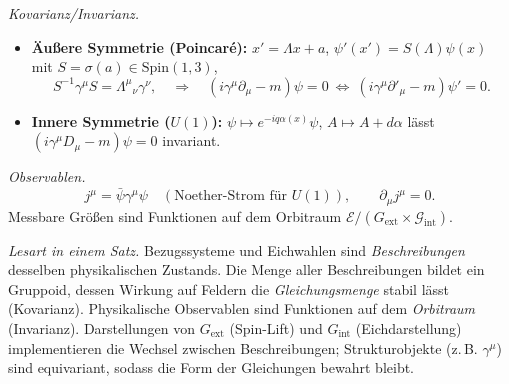 \documentclass[10pt, letterpaper]{article}
\newcommand{\Spin}{\mathrm{Spin}}
\begin{document}
\emph{Kovarianz/Invarianz.}
\begin{itemize}
\item \textbf{Äußere Symmetrie (Poincaré):} $x'=\Lambda x + a$, $\psi'(x')=S(\Lambda)\psi(x)$ mit $S=\sigma(a)\in \Spin(1,3)$,
\[
S^{-1}\gamma^\mu S=\Lambda^\mu{}_\nu\gamma^\nu,
\quad\Rightarrow\quad
(i\gamma^\mu\partial_\mu - m)\psi=0\ \Leftrightarrow\ (i\gamma^\mu\partial'_\mu - m)\psi'=0.
\]
\item \textbf{Innere Symmetrie ($U(1)$):}
$\psi\mapsto e^{-iq\alpha(x)}\psi$, $A\mapsto A+d\alpha$ lässt $(i\gamma^\mu D_\mu - m)\psi=0$ invariant.
\end{itemize}

\emph{Observablen.}
\[
j^\mu=\bar\psi\gamma^\mu\psi \quad (\text{Noether-Strom für }U(1)),\qquad
\partial_\mu j^\mu=0.
\]
Messbare Größen sind Funktionen auf dem Orbitraum $\mathcal{E}/(G_{\mathrm{ext}}\times \mathcal{G}_{\mathrm{int}})$.

\bigskip

\emph{Lesart in einem Satz.}
Bezugssysteme und Eichwahlen sind \emph{Beschreibungen} desselben physikalischen Zustands.
Die Menge aller Beschreibungen bildet ein Gruppoid, dessen Wirkung auf Feldern die
\emph{Gleichungsmenge} stabil lässt (Kovarianz). Physikalische Observablen sind Funktionen auf dem \emph{Orbitraum} (Invarianz). Darstellungen von $G_{\mathrm{ext}}$ (Spin-Lift) und $G_{\mathrm{int}}$ (Eichdarstellung) implementieren die Wechsel zwischen Beschreibungen; Strukturobjekte (z.\,B. $\gamma^\mu$) sind equivariant, sodass die Form der Gleichungen bewahrt bleibt.


\pagebreak
\printbibliography
\end{document}
